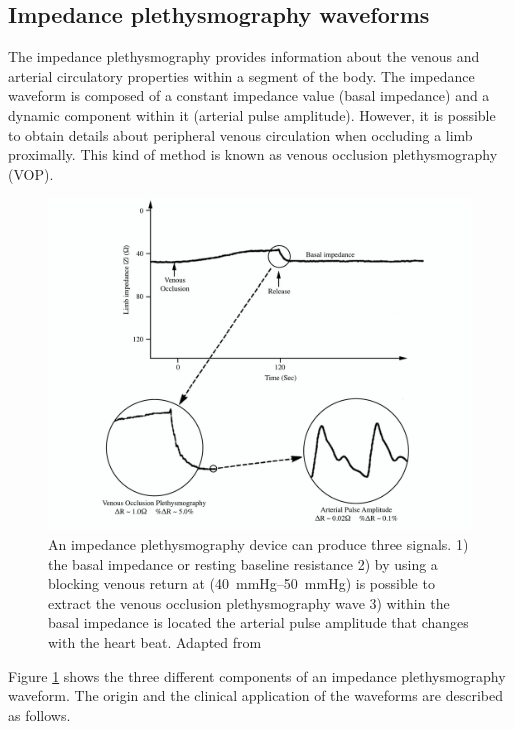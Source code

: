 \subsection{Impedance plethysmography waveforms}
\label{section impedance 8.1}
The impedance plethysmography provides information about the venous and arterial circulatory properties within a segment of the body. The impedance waveform is composed of a constant impedance value (basal impedance) and a dynamic component within it (arterial pulse amplitude). However, it is possible to obtain details about peripheral venous circulation when occluding a limb proximally. This kind of method is known as venous occlusion plethysmography (VOP).

\begin{figure}[!htpb]
	\centering
	\includegraphics[width=\textwidth,keepaspectratio]{figure16}    
	\caption[Signal from an impedance plethysmography device]{An impedance plethysmography device can produce three signals. 1) the basal impedance or resting baseline resistance 2) by using a blocking venous return at (\SIrange{40}{50}{\mmHg}) is possible to extract the venous occlusion plethysmography wave 3) within the basal impedance is located the arterial pulse amplitude that changes with the heart beat. Adapted from \cite{anderson1984impedance}}
	\label{fig:iPG signals}
\end{figure}

Figure \ref{fig:iPG signals} shows the three different components of an impedance plethysmography waveform. The origin and the clinical application of the waveforms are described as follows. 

